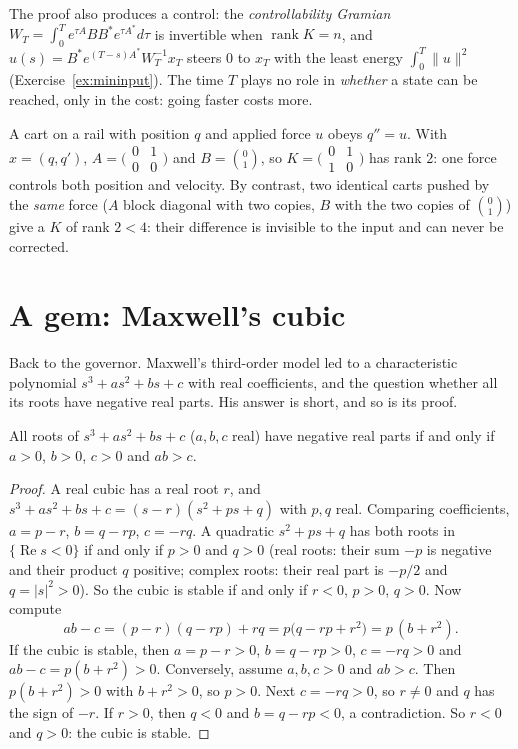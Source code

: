 The proof also produces a control: the \emph{controllability Gramian} $W_T=\int_0^Te^{\tau A}BB^*e^{\tau A^*}d\tau$ is invertible when
$\operatorname{rank}K=n$, and $u(s)=B^*e^{(T-s)A^*}W_T^{-1}x_T$ steers $0$ to $x_T$ with the least energy $\int_0^T\|u\|^2$ (Exercise~\ref{ex:mininput}).
The time $T$ plays no role in \emph{whether} a state can be reached, only in the cost: going faster costs more.

\begin{example}\label{exa:doubleintegrator}
A cart on a rail with position $q$ and applied force $u$ obeys $q''=u$. With $x=(q,q')$, $A=\bigl(\begin{smallmatrix}0&1\\0&0\end{smallmatrix}
\bigr)$ and $B=\binom01$, so $K=\bigl(\begin{smallmatrix}0&1\\1&0\end{smallmatrix}\bigr)$ has rank $2$: one force controls both position and
velocity. By contrast, two identical carts pushed by the \emph{same} force ($A$ block diagonal with two copies, $B$ with the two copies of
$\binom01$) give a $K$ of rank $2<4$: their difference is invisible to the input and can never be corrected.
\end{example}

\section{A gem: Maxwell's cubic}

Back to the governor. Maxwell's third-order model led to a characteristic polynomial $s^3+as^2+bs+c$ with real coefficients, and the
question whether all its roots have negative real parts. His answer is short, and so is its proof.

\begin{theorem}[Maxwell, 1868]\label{thm:maxwell}
All roots of $s^3+as^2+bs+c$ ($a,b,c$ real) have negative real parts if and only if $a>0$, $b>0$, $c>0$ and $ab>c$.
\end{theorem}
\begin{proof}
A real cubic has a real root $r$, and $s^3+as^2+bs+c=(s-r)(s^2+ps+q)$ with $p,q$ real. Comparing coefficients, $a=p-r$, $b=q-rp$,
$c=-rq$. A quadratic $s^2+ps+q$ has both roots in $\{\operatorname{Re}s<0\}$ if and only if $p>0$ and $q>0$ (real roots: their sum $-p$ is
negative and their product $q$ positive; complex roots: their real part is $-p/2$ and $q=|s|^2>0$). So the cubic is stable if and only if
$r<0$, $p>0$, $q>0$. Now compute
\[
ab-c=(p-r)(q-rp)+rq=p\bigl(q-rp+r^2\bigr)=p\,(b+r^2).
\]
If the cubic is stable, then $a=p-r>0$, $b=q-rp>0$, $c=-rq>0$ and $ab-c=p(b+r^2)>0$. Conversely, assume $a,b,c>0$ and $ab>c$. Then
$p(b+r^2)>0$ with $b+r^2>0$, so $p>0$. Next $c=-rq>0$, so $r\ne0$ and $q$ has the sign of $-r$. If $r>0$, then $q<0$ and $b=q-rp<0$,
a contradiction. So $r<0$ and $q>0$: the cubic is stable.
\end{proof}

